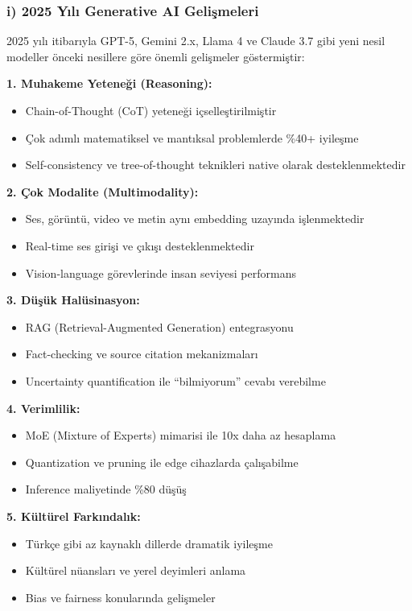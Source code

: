 \documentclass[conference]{IEEEtran}
\begin{document}
\vspace{0.5cm}

\subsubsection*{i) 2025 Yılı Generative AI Gelişmeleri}

2025 yılı itibarıyla GPT-5, Gemini 2.x, Llama 4 ve Claude 3.7 gibi yeni nesil modeller önceki nesillere göre önemli gelişmeler göstermiştir:

\textbf{1. Muhakeme Yeteneği (Reasoning):}
\begin{itemize}
    \item Chain-of-Thought (CoT) yeteneği içselleştirilmiştir
    \item Çok adımlı matematiksel ve mantıksal problemlerde \%40+ iyileşme
    \item Self-consistency ve tree-of-thought teknikleri native olarak desteklenmektedir
\end{itemize}

\textbf{2. Çok Modalite (Multimodality):}
\begin{itemize}
    \item Ses, görüntü, video ve metin aynı embedding uzayında işlenmektedir
    \item Real-time ses girişi ve çıkışı desteklenmektedir
    \item Vision-language görevlerinde insan seviyesi performans
\end{itemize}

\textbf{3. Düşük Halüsinasyon:}
\begin{itemize}
    \item RAG (Retrieval-Augmented Generation) entegrasyonu
    \item Fact-checking ve source citation mekanizmaları
    \item Uncertainty quantification ile ``bilmiyorum'' cevabı verebilme
\end{itemize}

\textbf{4. Verimlilik:}
\begin{itemize}
    \item MoE (Mixture of Experts) mimarisi ile 10x daha az hesaplama
    \item Quantization ve pruning ile edge cihazlarda çalışabilme
    \item Inference maliyetinde \%80 düşüş
\end{itemize}

\textbf{5. Kültürel Farkındalık:}
\begin{itemize}
    \item Türkçe gibi az kaynaklı dillerde dramatik iyileşme
    \item Kültürel nüansları ve yerel deyimleri anlama
    \item Bias ve fairness konularında gelişmeler
\end{itemize}
\end{document}
